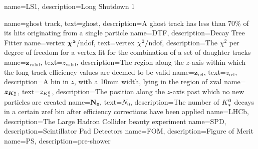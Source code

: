                  {
                   name=LS1,
                   description={Long Shutdown 1}
                 }


                 {
                   name=ghost track,
                   text=ghost,
                                    description={A ghost track has less than 70\% of its hits originating from a single particle} 
}
                 {
                   name=DTF,
                                                       description={Decay Tree Fitter} 
}
                 {
                   name=vertex $\mathbold{\chisq}$/ndof,
                   text=vertex $\chi^2/$ndof,
                                    description={The $\chi^{2}$ per degree of freedom for a vertex fit for the combination of a set of daughter tracks} 
}
                 {
                   name=$\mathbold{z_{\mathrm{valid}}}$,
                   text=$z_{\mathrm{valid}}$,
                                    description={The region along the $z$-axis within which the long track efficiency values are deemed to be valid} 
}
                 {
                   name=$\mathbold{z_{\mathrm{ref}}}$,
                   text=$z_{\mathrm{ref}}$,
                                    description={A bin in $z$, with a 10mm width, lying in the region of \gls{zval}} 
}
                 {
                   name=$\mathbold{z_{\KS}}$,
                   text=$z_{{{K}^0_{s}}}$,
                                    description={The position along the $z$-axis past which no new \KS particles are created} 
}
                 {
                   name=$\mathbold{N_{0}}$,
                   text=$N_{0}$,
                    description={The number of ${{K}^0_{s}}$ decays in a certain \gls{zref} bin after efficiency corrections have been applied}}
                 {
                   name=LHCb,
                   description={The Large Hadron Collider beauty experiment}
                                    }
                 {
                   name=SPD,
                   description={Scintillator Pad Detectors}
                                    }
                 {
                   name=FOM,
                   description={Figure of Merit}
                                    }                                    
                 {
                   name=PS,
                   description={pre-shower}
                                    }                                    
